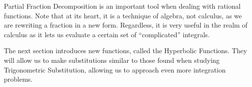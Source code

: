 Partial Fraction Decomposition is an important tool when dealing with rational functions. Note that at its heart, it is a technique of algebra, not calculus, as we are rewriting a fraction in a new form. Regardless, it is very useful in the realm of calculus as it lets us evaluate a certain set of ``complicated'' integrals.

The next section introduces new functions, called the Hyperbolic Functions. They will allow us to make substitutions similar to those found when studying Trigonometric Substitution, allowing us to approach even more integration problems. 


